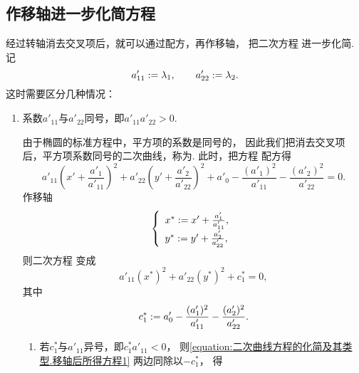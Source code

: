 \subsection{作移轴进一步化简方程}
经过转轴消去交叉项后，就可以通过配方，再作移轴，
把二次方程  进一步化简.
记\begin{equation*}
	a'_{11} := \lambda_1,
	\qquad
	a'_{22} := \lambda_2.
\end{equation*}
这时需要区分几种情况：
\begin{enumerate}
	\item 系数\(a'_{11}\)与\(a'_{22}\)同号，即\(a'_{11} a'_{22} > 0\).

	由于椭圆的标准方程中，平方项的系数是同号的，
	因此我们把消去交叉项后，平方项系数同号的二次曲线，称为.
	此时，把方程 
	配方得\begin{equation*}
		a'_{11} \left( x' + \frac{a'_1}{a'_{11}} \right)^2
		+ a'_{22} \left( y' + \frac{a'_2}{a'_{22}} \right)^2
		+ a'_0
		- \frac{(a'_1)^2}{a'_{11}}
		- \frac{(a'_2)^2}{a'_{22}}
		= 0.
	\end{equation*}
	作移轴\begin{equation}\label{equation:二次曲线方程的化简及其类型.移轴变换}
		\def\arraystretch{1.5}
		\left\{ \begin{array}{l}
			x^* \defeq x' + \frac{a'_1}{a'_{11}}, \\
			y^* \defeq y' + \frac{a'_2}{a'_{22}},
		\end{array} \right.
	\end{equation}
	则二次方程 
	变成\begin{equation}\label{equation:二次曲线方程的化简及其类型.移轴后所得方程1}
		a'_{11} (x^*)^2 + a'_{22} (y^*)^2 + c^*_1 = 0,
	\end{equation}
	其中\begin{equation*}
		c^*_1
		:= a'_0
		- \frac{(a'_1)^2}{a'_{11}}
		- \frac{(a'_2)^2}{a'_{22}}.
	\end{equation*}
	\begin{enumerate}
		\item 若\(c^*_1\)与\(a'_{11}\)异号，即\(c^*_1 a'_{11} < 0\)，
		则\cref{equation:二次曲线方程的化简及其类型.移轴后所得方程1} 两边同除以\(-c^*_1\)，
		得\begin{equation}\label{equation:二次曲线方程的化简及其类型.移轴后所得方程2}

\end{equation}
\end{enumerate}
\end{enumerate}
